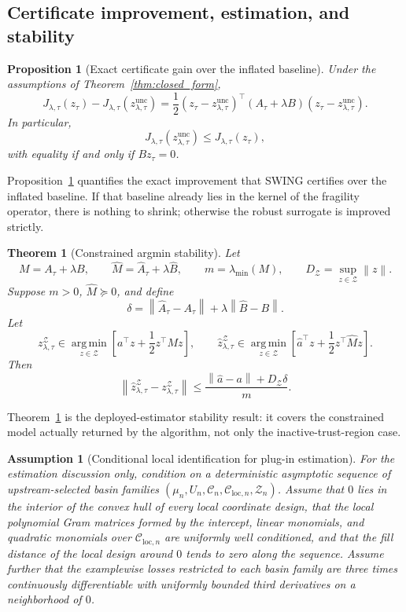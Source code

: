 \documentclass{article}
\newtheorem{theorem}{Theorem}
\newtheorem{proposition}{Proposition}
\newtheorem{assumption}{Assumption}
\newcommand{\cC}{\mathcal{C}}
\newcommand{\cZ}{\mathcal{Z}}
\newcommand{\argmin}{\operatorname*{arg\,min}}
\newcommand{\swing}{\textup{\textsc{SWING}}}
\newcommand{\norm}[1]{\left\lVert #1 \right\rVert}
\newcommand{\bracks}[1]{\left[ #1 \right]}
\begin{document}
\subsection{Certificate improvement, estimation, and stability}

\begin{proposition}[Exact certificate gain over the inflated baseline]
\label{prop:gain}
Under the assumptions of Theorem~\ref{thm:closed_form},
\[
J_{\lambda,\tau}(z_\tau) - J_{\lambda,\tau}(z_{\lambda,\tau}^{\mathrm{unc}})
=
\frac12 (z_\tau-z_{\lambda,\tau}^{\mathrm{unc}})^\top (A_\tau+\lambda B)(z_\tau-z_{\lambda,\tau}^{\mathrm{unc}}).
\]
In particular,
\[
J_{\lambda,\tau}(z_{\lambda,\tau}^{\mathrm{unc}})\le J_{\lambda,\tau}(z_\tau),
\]
with equality if and only if \(B z_\tau = 0\).
\end{proposition}

Proposition~\ref{prop:gain} quantifies the exact improvement that \swing{} certifies over the inflated baseline. If that baseline already lies in the kernel of the fragility operator, there is nothing to shrink; otherwise the robust surrogate is improved strictly.

\begin{theorem}[Constrained argmin stability]
\label{thm:constrained}
Let
\[
M = A_\tau+\lambda B,
\qquad
\hat M = \hat A_\tau + \lambda \hat B,
\qquad
m = \lambda_{\min}(M),
\qquad
D_\cZ = \sup_{z\in\cZ}\norm{z}.
\]
Suppose \(m>0\), \(\hat M\succeq 0\), and define
\[
\delta = \norm{\hat A_\tau - A_\tau} + \lambda \norm{\hat B-B}.
\]
Let
\[
z_{\lambda,\tau}^{\cZ}
\in
\argmin_{z\in\cZ}
\bracks{a^\top z + \frac12 z^\top M z},
\qquad
\hat z_{\lambda,\tau}^{\cZ}
\in
\argmin_{z\in\cZ}
\bracks{\hat a^\top z + \frac12 z^\top \hat M z}.
\]
Then
\[
\norm{\hat z_{\lambda,\tau}^{\cZ} - z_{\lambda,\tau}^{\cZ}}
\le
\frac{\norm{\hat a-a} + D_\cZ \delta}{m}.
\]
\end{theorem}

Theorem~\ref{thm:constrained} is the deployed-estimator stability result: it covers the constrained model actually returned by the algorithm, not only the inactive-trust-region case.

\begin{assumption}[Conditional local identification for plug-in estimation]
\label{ass:identify}
For the estimation discussion only, condition on a deterministic asymptotic sequence of upstream-selected basin families \((\mu_n,U_n,\cC_n,\cC_{\mathrm{loc},n},\cZ_n)\). Assume that \(0\) lies in the interior of the convex hull of every local coordinate design, that the local polynomial Gram matrices formed by the intercept, linear monomials, and quadratic monomials over \(\cC_{\mathrm{loc},n}\) are uniformly well conditioned, and that the fill distance of the local design around \(0\) tends to zero along the sequence. Assume further that the examplewise losses restricted to each basin family are three times continuously differentiable with uniformly bounded third derivatives on a neighborhood of \(0\).
\end{assumption}
\end{document}
